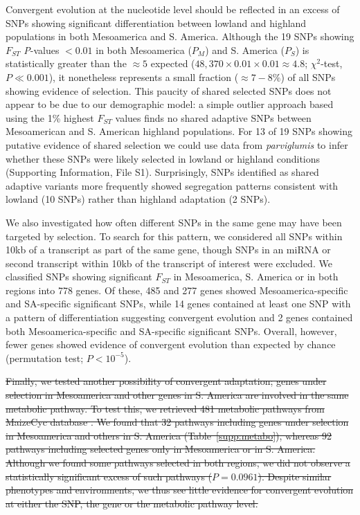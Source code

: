    
Convergent evolution at the nucleotide level should be reflected in an excess of SNPs showing significant differentiation between lowland and highland populations in both Mesoamerica and S. America. 
Although the 19 SNPs showing $F_{ST}$ \emph{P}-values  $<0.01$ in both Mesoamerica ($P_M$) and S. America ($P_S$) is statistically greater than the $\approx 5$ expected ($48,370\times 0.01 \times 0.01 \approx 4.8$; $\chi^2$-test, $P\ll0.001$), it nonetheless represents a small fraction ($\approx 7-8\%$) of all SNPs showing evidence of selection.
This paucity of shared selected SNPs does not appear to be due to our demographic model: 
a simple outlier approach based using the 1\% highest $F_{ST}$ values finds no shared adaptive SNPs between Mesoamerican and S. American highland populations. 
For 13 of 19 SNPs showing putative evidence of shared selection we could use data from \textit{parviglumis} to infer whether these SNPs were likely selected in lowland or highland conditions (Supporting Information, File S1).  
Surprisingly, SNPs identified as shared adaptive variants more frequently showed segregation patterns consistent with lowland  (10 SNPs) rather than highland adaptation (2 SNPs). %

We also investigated how often different SNPs in the same gene may have been targeted by selection. 
To search for this pattern, we considered all SNPs within 10kb of a transcript as part of the same gene, though SNPs in an miRNA or second transcript within 10kb of the transcript of interest were excluded.  
We classified SNPs showing significant $F_{ST}$ in Mesoamerica, S. America or in both regions into 778 genes. 
Of these, 485 and 277 genes showed Mesoamerica-specific and SA-specific significant SNPs, while 14 genes contained at least one SNP with a pattern of differentiation suggesting convergent evolution and 2 genes contained both Mesoamerica-specific and SA-specific significant SNPs. 
Overall, however, fewer genes showed evidence of convergent evolution than expected by chance (permutation test; $P<10^{-5}$). 

\st{
Finally, we tested another possibility of convergent adaptation; genes under selection in Mesoamerica and other genes in S. America are involved in the same metabolic pathway.
To test this, we retrieved 481 metabolic pathways from MaizeCyc database \cite[ver. 2.2;][]{maizecyc2013}.
We found that 32 pathways including genes under selection in Mesoamerica and others in S. America (Table~\ref{supp:metabo}), whereas 92 pathways including selected genes only in Mesoamerica or in S. America.
Although we found some pathways selected in both regions, we did not observe a statistically significant excess of such pathways ($P=0.0961$).
Despite similar phenotypes and environments, we thus see little evidence for convergent evolution at either the SNP, the gene or the metabolic pathway level.  }

